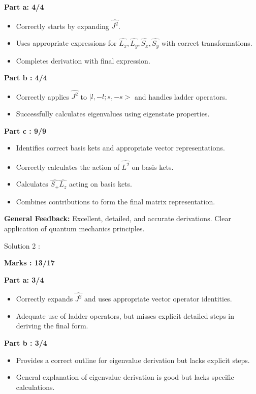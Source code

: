 \documentclass[a4paper,11pt]{article}
\begin{document}
\textbf{Part a: 4/4}
\begin{itemize}
    \item Correctly starts by expanding $\hat{J^2}$.
    \item Uses appropriate expressions for  $\hat{L_x}, \hat{L_y}, \hat{S_x}, \hat{S_y}$ with correct transformations.
    \item Completes derivation with final expression.
\end{itemize}


\textbf{Part b : 4/4}
\begin{itemize}
    \item Correctly applies $\hat{J^2}$ to $|l, -l ; s, -s>$ and handles ladder operators.
    \item Successfully calculates eigenvalues using eigenstate properties.
\end{itemize}


\textbf{Part c : 9/9}
\begin{itemize}
    \item Identifies correct basis kets and appropriate vector representations.
    \item Correctly calculates the action of $\hat{L^2}$ on basis kets.
    \item Calculates $\hat{S_+}\hat{L_z}$ acting on basis kets.
    \item Combines contributions to form the final matrix representation.
\end{itemize}

\textbf{General Feedback:}
Excellent, detailed, and accurate derivations. Clear application of quantum mechanics principles.


Solution 2 :

\textbf{Marks : 13/17}

\textbf{Part a: 3/4}
\begin{itemize}
    \item Correctly expands $\hat{J^2}$ and uses appropriate vector operator identities.
    \item Adequate use of ladder operators, but misses explicit detailed steps in deriving the final form.
\end{itemize}


\textbf{Part b : 3/4}
\begin{itemize}
    \item Provides a correct outline for eigenvalue derivation but lacks explicit steps.
    \item General explanation of eigenvalue derivation is good but lacks specific calculations.
\end{itemize}
\end{document}
